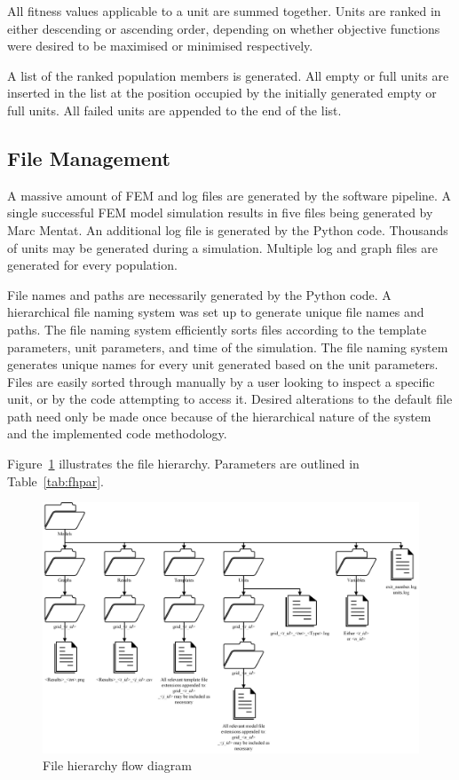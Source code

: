 All fitness values applicable to a unit are summed together. Units are ranked in either descending or ascending order, depending on whether objective functions were desired to be maximised or minimised respectively.

A list of the ranked population members is generated. All empty or full units are inserted in the list at the position occupied by the initially generated empty or full units. All failed units are appended to the end of the list.

\subsection{File Management}
\label{ssec:fm}

A massive amount of FEM and log files are generated by the software pipeline. A single successful FEM model simulation results in five files being generated by Marc Mentat. An additional log file is generated by the Python code. Thousands of units may be generated during a simulation. Multiple log and graph files are generated for every population.

File names and paths are necessarily generated by the Python code. A hierarchical file naming system was set up to generate unique file names and paths. The file naming system efficiently sorts files according to the template parameters, unit parameters, and time of the simulation. The file naming system generates unique names for every unit generated based on the unit parameters. Files are easily sorted through manually by a user looking to inspect a specific unit, or by the code attempting to access it. Desired alterations to the default file path need only be made once because of the hierarchical nature of the system and the implemented code methodology.

Figure~\ref{fig:fh} illustrates the file hierarchy. Parameters are outlined in Table~\ref{tab:fhpar}.

\begin{landscape}
 \begin{figure}[ht]
  \centering
  \includegraphics[width=1.4\textwidth]{FileHierarchy.png}
  \caption{File hierarchy flow diagram}
  \label{fig:fh}
 \end{figure}
\end{landscape}

